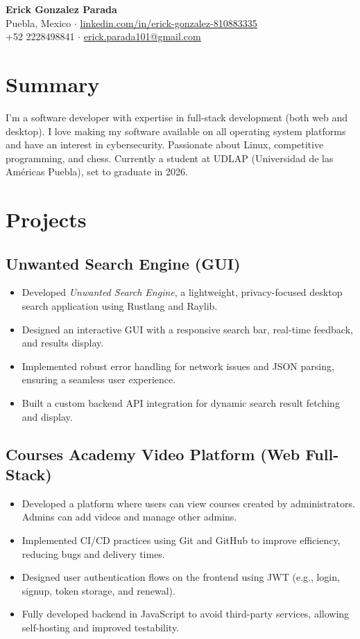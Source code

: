\documentclass[a4paper,10pt]{article}
\begin{document}
\begin{center}
    {\LARGE \textbf{Erick Gonzalez Parada}} \\
    Puebla, Mexico $\cdot$ \underline{\href{https://linkedin.com/in/erick-gonzalez-810883335}{linkedin.com/in/erick-gonzalez-810883335}} \\
    +52 2228498841 $\cdot$ \underline{\href{mailto:erick.parada101@gmail.com}{erick.parada101@gmail.com}}
\end{center}

\section*{Summary}
I'm a software developer with expertise in full-stack development (both web and desktop). I love making my software available on all operating system platforms and have an interest in cybersecurity. Passionate about Linux, competitive programming, and chess. Currently a student at UDLAP (Universidad de las Américas Puebla), set to graduate in 2026.

\section*{Projects}
\subsection*{Unwanted Search Engine (GUI)}
\begin{itemize}
    \item Developed \textit{Unwanted Search Engine}, a lightweight, privacy-focused desktop search application using Rustlang and Raylib.
    \item Designed an interactive GUI with a responsive search bar, real-time feedback, and results display.
    \item Implemented robust error handling for network issues and JSON parsing, ensuring a seamless user experience.
    \item Built a custom backend API integration for dynamic search result fetching and display.
\end{itemize}

\subsection*{Courses Academy Video Platform (Web Full-Stack)}
\begin{itemize}
    \item Developed a platform where users can view courses created by administrators. Admins can add videos and manage other admins.
    \item Implemented CI/CD practices using Git and GitHub to improve efficiency, reducing bugs and delivery times.
    \item Designed user authentication flows on the frontend using JWT (e.g., login, signup, token storage, and renewal).
    \item Fully developed backend in JavaScript to avoid third-party services, allowing self-hosting and improved testability.
\end{itemize}
\end{document}

